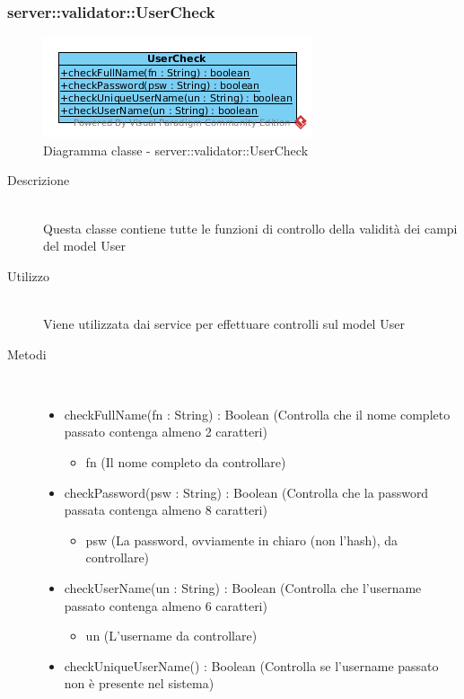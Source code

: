 \subsubsection[UserCheck]{server::validator::UserCheck}
\begin{center}
			\begin{figure}[H]
				\centering \includegraphics[scale=4, max width=\textwidth, max height=\myheight]{../img/diagrammiClassi/server/validator/UserCheck.png}
				\caption{Diagramma classe - server::validator::UserCheck}
			\end{figure}
		\end{center}\begin{description}
\item[Descrizione] \hfill \\
 Questa classe contiene tutte le funzioni di controllo della validità dei campi del model User
\item[Utilizzo] \hfill \\
 Viene utilizzata dai service per effettuare controlli sul model User
\item[Metodi] \hfill \\
 \vspace{-7mm}
\begin{itemize}
\item checkFullName(fn : String) : Boolean (Controlla che il nome completo passato contenga almeno 2 caratteri)\begin{itemize}
\item fn (Il nome completo da controllare)
\end{itemize}

\item checkPassword(psw : String) : Boolean (Controlla che la password passata contenga almeno 8 caratteri)\begin{itemize}
\item psw (La password, ovviamente in chiaro (non l'hash), da controllare)
\end{itemize}

\item checkUserName(un : String) : Boolean (Controlla che l'username passato contenga almeno 6 caratteri)\begin{itemize}
\item un (L'username da controllare)
\end{itemize}

\item checkUniqueUserName() : Boolean (Controlla se l'username passato non è presente nel sistema)
\end{itemize}

\end{description}

